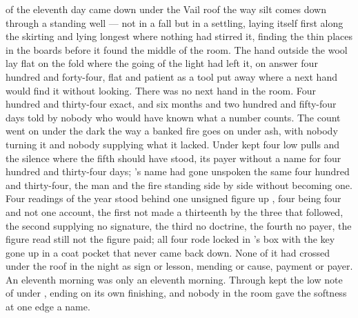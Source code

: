 
 of the eleventh day came down under the Vail roof the way silt comes down through a standing well --- not in a fall but in a settling, laying itself first along the skirting and lying longest where nothing had stirred it, finding the thin places in the boards before it found the middle of the room. The hand outside the wool lay flat on the fold where the going of the light had left it, on answer four hundred and forty-four, flat and patient as a tool put away where a next hand would find it without looking. There was no next hand in the room. Four hundred and thirty-four exact, and six months and two hundred and fifty-four days told by nobody who would have known what a number counts. The count went on under the dark the way a banked fire goes on under ash, with nobody turning it and nobody supplying what it lacked. Under   kept four low pulls and the silence where the fifth should have stood, its payer without a name for four hundred and thirty-four days; 's name had gone unspoken the same four hundred and thirty-four, the man and the fire standing side by side without becoming one. Four readings of the year stood behind one unsigned figure up , four being four and not one account, the first not made a thirteenth by the three that followed, the second supplying no signature, the third no doctrine, the fourth no payer, the figure read still not the figure paid; all four rode locked in 's box with the key gone up in a coat pocket that never came back down. None of it had crossed under the roof in the night as sign or lesson, mending or cause, payment or payer. An eleventh morning was only an eleventh morning. Through   kept the low note of  under , ending on its own finishing, and nobody in the room gave the softness at one edge a name.

